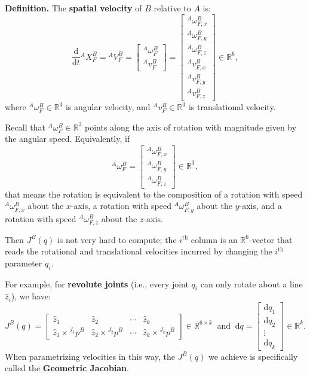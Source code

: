 \textbf{Definition.}
The \textbf{spatial velocity} of $B$ relative to $A$ is:
\[ \frac{\mathrm{d}}{\mathrm{d}t} {}^AX^B_F
= {}^AV^B_F = \begin{bmatrix}
{}^A\omega^B_F \\ {}^Av^B_F
\end{bmatrix}
= \begin{bmatrix}
{}^A\omega^B_{F, x} \\
{}^A\omega^B_{F, y} \\
{}^A\omega^B_{F, z} \\
{}^Av^B_{F, x} \\
{}^Av^B_{F, y} \\
{}^Av^B_{F, z}
\end{bmatrix} \in \mathbb{R}^6, \]
where ${}^A\omega^B_F \in \mathbb{R}^3$ is angular velocity,
and ${}^Av^B_F \in \mathbb{R}^3$ is translational velocity.

\begin{remark}
    Recall that ${}^A\omega^B_F \in \mathbb{R}^3$
    points along the axis of rotation with magnitude given by
    the angular speed.  Equivalently, if
    \[ {}^A\omega^B_F = \begin{bmatrix} {}^A\omega^B_{F, x} \\
    {}^A\omega^B_{F, y} \\
    {}^A\omega^B_{F, z} \end{bmatrix} \in \mathbb{R}^3, \]
    that means the rotation is equivalent to the composition of
    a rotation with speed ${}^A\omega^B_{F, x}$ about the $x$-axis,
    a rotation with speed ${}^A\omega^B_{F, y}$ about the $y$-axis,
    and a rotation with speed ${}^A\omega^B_{F, z}$ about the $z$-axis.
\end{remark}

Then $J^B(q)$ is not very hard to compute;
the $i^{\text{th}}$ column is an $\mathbb{R}^6$-vector
that reads the rotational and translational velocities
incurred by changing the $i^{\text{th}}$ parameter $q_i$.

For example, for \textbf{revolute joints}
(i.e., every joint $q_i$ can only rotate about a line $\hat{z}_i$), we have:
\[
    J^B(q) = \begin{bmatrix}
    \hat{z}_1 & \hat{z}_2 & \cdots & \hat{z}_k \\
    \hat{z}_1 \times {}^{J_1}p^B & \hat{z}_2 \times {}^{J_2}p^B & \cdots &
    \hat{z}_k \times {}^{J_k}p^B
    \end{bmatrix} \in \mathbb{R}^{6 \times k}
    ~ \text{ and } ~
    \mathrm{d}q = \begin{bmatrix}
        \mathrm{d}q_1 \\ \mathrm{d}q_2 \\ \vdots \\ \mathrm{d}q_k
    \end{bmatrix} \in \mathbb{R}^k.
\]
When parametrizing velocities in this way,
the $J^B(q)$ we achieve is specifically called
the \textbf{Geometric Jacobian}.

